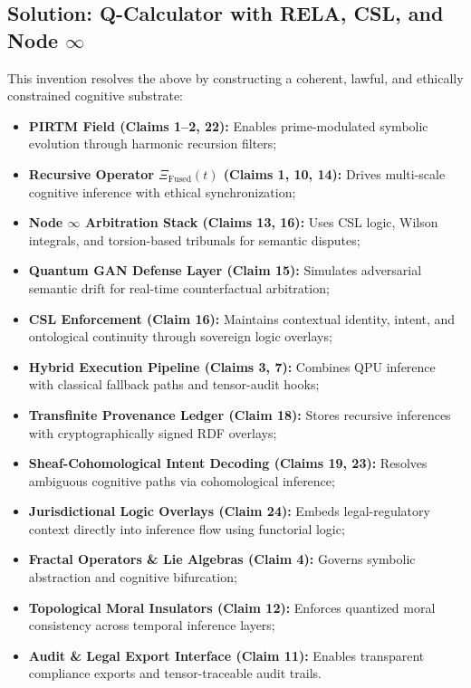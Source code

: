 \documentclass[12pt]{article}
\begin{document}
\subsection*{Solution: Q-Calculator with RELA, CSL, and Node \( \infty \)}

This invention resolves the above by constructing a coherent, lawful, and ethically constrained cognitive substrate:

\begin{itemize}
    \item \textbf{PIRTM Field (Claims 1–2, 22):} Enables prime-modulated symbolic evolution through harmonic recursion filters;
    \item \textbf{Recursive Operator \( \Xi_{\text{Fused}}(t) \) (Claims 1, 10, 14):} Drives multi-scale cognitive inference with ethical synchronization;
    \item \textbf{Node \( \infty \) Arbitration Stack (Claims 13, 16):} Uses CSL logic, Wilson integrals, and torsion-based tribunals for semantic disputes;
    \item \textbf{Quantum GAN Defense Layer (Claim 15):} Simulates adversarial semantic drift for real-time counterfactual arbitration;
    \item \textbf{CSL Enforcement (Claim 16):} Maintains contextual identity, intent, and ontological continuity through sovereign logic overlays;
    \item \textbf{Hybrid Execution Pipeline (Claims 3, 7):} Combines QPU inference with classical fallback paths and tensor-audit hooks;
    \item \textbf{Transfinite Provenance Ledger (Claim 18):} Stores recursive inferences with cryptographically signed RDF overlays;
    \item \textbf{Sheaf-Cohomological Intent Decoding (Claims 19, 23):} Resolves ambiguous cognitive paths via cohomological inference;
    \item \textbf{Jurisdictional Logic Overlays (Claim 24):} Embeds legal-regulatory context directly into inference flow using functorial logic;
    \item \textbf{Fractal Operators & Lie Algebras (Claim 4):} Governs symbolic abstraction and cognitive bifurcation;
    \item \textbf{Topological Moral Insulators (Claim 12):} Enforces quantized moral consistency across temporal inference layers;
    \item \textbf{Audit & Legal Export Interface (Claim 11):} Enables transparent compliance exports and tensor-traceable audit trails.
\end{itemize}
\end{document}
